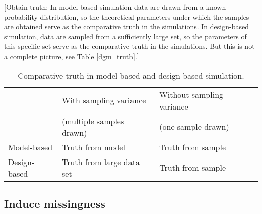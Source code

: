 \documentclass[bimj,fleqn]{w-art}
\begin{document}
[Obtain truth: In model-based simulation data are drawn from a known probability distribution, so the theoretical parameters under which the samples are obtained serve as the comparative truth in the simulations. In design-based simulation, data are sampled from a sufficiently large set, so the parameters of this specific set serve as the comparative truth in the simulations. But this is not a complete picture, see Table \ref{dgm_truth}.]

\begin{table}[htb]
\begin{center}
\caption{Comparative truth in model-based and design-based simulation.}
\label{table:dgm_truth}
\begin{tabular}{lll}
\hline
               & With sampling variance      & Without sampling variance \\
               & (multiple samples drawn)    & (one sample drawn) \\
\hline  
Model-based    & Truth from model            & Truth from sample \\
Design-based   & Truth from large data set   & Truth from sample \\
\hline
\end{tabular}
\end{center}
\end{table}



\subsection{Induce missingness}

\end{document}

